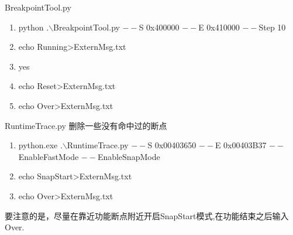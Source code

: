 \documentclass[AutoFakeBold,AutoFakeSlant]{article}
\begin{document}
\begin{flushleft}
\begin{enumerate}
{					\small
					BreakpointTool.py
					\begin{enumerate}
						\item python .$\backslash$BreakpointTool.py $--$S 0x400000 $--$E 0x410000 $--$Step 10
						\item echo Running>ExternMsg.txt
						\item yes
						\item echo Reset>ExternMsg.txt
						\item echo Over>ExternMsg.txt
					\end{enumerate}
					RuntimeTrace.py
					删除一些没有命中过的断点
					\begin{enumerate}
						\item python.exe .$\backslash$RuntimeTrace.py $--$S 0x00403650 $--$E 0x00403B37 $--$EnableFastMode $--$EnableSnapMode
						\item echo SnapStart>ExternMsg.txt
						\item echo Over>ExternMsg.txt
					\end{enumerate}
					要注意的是，尽量在靠近功能断点附近开启SnapStart模式,在功能结束之后输入Over.
				}
		\end{enumerate}
	\end{flushleft}
		
\end{document}
